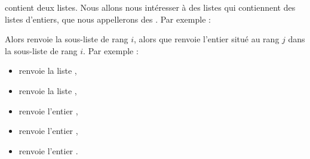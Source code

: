 \documentclass[11pt,class=report,crop=false]{standalone}
\begin{document}
\begin{cours}
\begin{itemize}
   contient deux listes. 
  Nous allons nous intéresser à des listes qui contiennent des listes d'entiers, que nous appellerons des . Par exemple : 
  
  \centerline{}
  
  Alors  renvoie la sous-liste de rang $i$, alors que
   renvoie l'entier situé au rang $j$ dans la sous-liste de rang $i$. Par exemple :
  \begin{itemize}
  \item {} renvoie la liste \ci{[2,14,5]},
  \item {} renvoie la liste \ci{[3,5,7]},
  \item {} renvoie l'entier ,
  \item {} renvoie l'entier ,
  \item {} renvoie l'entier .
\end{itemize}

\end{itemize}
\end{cours}


\end{document}
